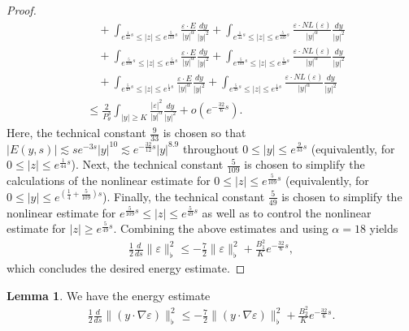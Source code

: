 \documentclass[11pt,reqno]{amsart}
\theoremstyle{definition}
\theoremstyle{bfremark}
\newtheorem{lemma}{Lemma}[section]
\numberwithin{equation}{section}
\begin{document}
\begin{proof}
\begin{align*}
    & \quad +\int_{e^{\frac{1}{44}s} \leq |z| \leq e^{\frac{5}{109}s}} \frac{\varepsilon \cdot E}{|y|^{\alpha}}\frac{dy}{|y|^2}+\int_{e^{\frac{1}{44}s} \leq |z| \leq e^{\frac{5}{109}s}} \frac{\varepsilon \cdot NL(\varepsilon)}{|y|^{\alpha}}\frac{dy}{|y|^2}\\
    & \quad +\int_{e^{\frac{5}{109}s} \leq |z| \leq e^{\frac{5}{49}s}} \frac{\varepsilon \cdot E}{|y|^{\alpha}}\frac{dy}{|y|^2}+\int_{e^{\frac{5}{109}s} \leq |z| \leq e^{\frac{5}{49}s}} \frac{\varepsilon \cdot NL(\varepsilon)}{|y|^{\alpha}}\frac{dy}{|y|^2}\\
    & \quad +\int_{e^{\frac{5}{49}s} \leq |z| \leq e^{\frac{1}{4}s}} \frac{\varepsilon \cdot E}{|y|^{\alpha}}\frac{dy}{|y|^2}+\int_{e^{\frac{5}{49}s} \leq |z| \leq e^{\frac{1}{4}s}} \frac{\varepsilon \cdot NL(\varepsilon)}{|y|^{\alpha}}\frac{dy}{|y|^2}\\
    & \leq \frac{2}{P_{\theta}^3} \int_{|y|\geq K}\frac{|\varepsilon|^2}{|y|^{\alpha}}\frac{dy}{|y|^2}+o(e^{-\frac{32}{6}s}).
\end{align*}
Here, the technical constant \(\frac{9}{33}\) is chosen so that \(|E(y,s)| \lesssim se^{-3s}|y|^{10} \lesssim e^{-\frac{32}{12}s}|y|^{8.9}\) throughout \(0 \leq |y| \leq e^{\frac{9}{33}s}\) (equivalently, for \(0 \leq |z| \leq e^{\frac{1}{44}s}\)). Next, the technical constant \(\frac{5}{109}\) is chosen to simplify the calculations of the nonlinear estimate for \(0 \leq |z| \leq e^{\frac{5}{109}s}\) (equivalently, for \(0 \leq |y| \leq e^{(\frac{1}{4}+\frac{5}{109})s}\)). Finally, the technical constant \(\frac{5}{49}\) is chosen to simplify the nonlinear estimate for \(e^{\frac{5}{109}s}\leq |z| \leq e^{\frac{5}{49}s}\) as well as to control the nonlinear estimate for \(|z| \geq e^{\frac{5}{49}s}\). Combining the above estimates and using \(\alpha=18\) yields
\begin{align}
        \frac{1}{2}\frac{d}{ds}\|\varepsilon\|_{\flat}^2 \leq-\frac{7}{2}\|\varepsilon\|^2_{\flat}+\frac{B_1^2}{K} e^{-\frac{32}{6}s},
\end{align}
which concludes the desired energy estimate.
\end{proof}
\begin{lemma}
\label{Lemma5.6}
    We have the energy estimate
    \begin{align}
        \frac{1}{2}\frac{d}{ds}\|(y \cdot \nabla \varepsilon)\|_{\flat}^2 \leq-\frac{7}{2}\|(y \cdot \nabla \varepsilon)\|^2_{\flat}+\frac{B_2^2}{K} e^{-\frac{32}{6}s}.\label{en4}
    \end{align}
   
\end{lemma}
\end{document}
